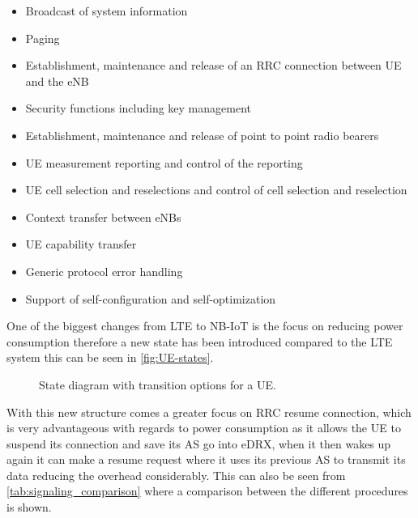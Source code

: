 \begin{itemize}
	\item Broadcast of system information
	\item Paging
	\item Establishment, maintenance and release of an \gls{RRC} connection between \gls{UE} and the \gls{eNB}
	\item Security functions including key management
	\item Establishment, maintenance and release of point to point radio bearers
	\item \gls{UE} measurement reporting and control of the reporting
	\item \gls{UE} cell selection and reselections and control of cell selection and reselection
	\item Context transfer between \gls{eNB}s
	\item \gls{UE} capability transfer
	\item Generic protocol error handling
	\item Support of self-configuration and self-optimization
\end{itemize}

One of the biggest changes from \gls{LTE} to \gls{NB-IoT} is the focus on reducing power consumption therefore a new state has been introduced compared to the \gls{LTE} system this can be seen in \autoref{fig:UE-states}.

\begin{figure}[H]
\centering

\caption{State diagram with transition options for a \gls{UE}.}
\label{fig:UE-states}
\end{figure}


With this new structure comes a greater focus on \gls{RRC} resume connection, which is very advantageous with regards to power consumption as it allows the \gls{UE} to suspend its connection and save its \gls{AS} go into \gls{eDRX}, when it then wakes up again it can make a resume request where it uses its previous \gls{AS} to transmit its data reducing the overhead considerably. This can also be seen from \autoref{tab:signaling_comparison} where a comparison between the different procedures is shown. 

